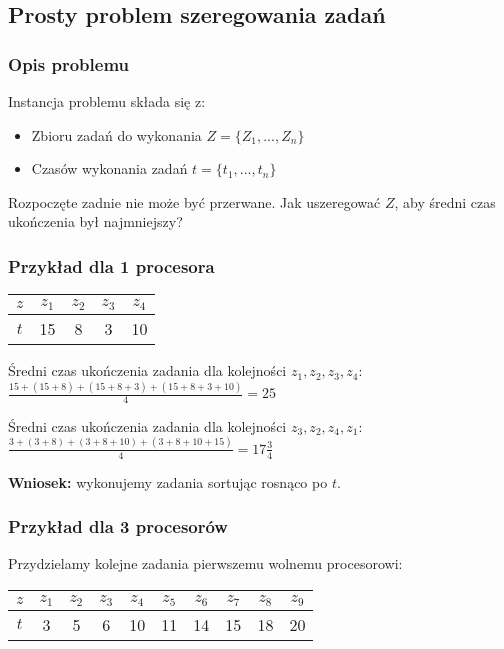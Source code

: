\subsection{Prosty problem szeregowania zadań}
\subsubsection{Opis problemu}
Instancja problemu składa się z:
\begin{itemize}
	\item Zbioru zadań do wykonania $Z= \{ Z_1,...,Z_n \}$
    \item Czasów wykonania zadań $t = \{ t_1,...,t_n\}$
\end{itemize}
Rozpoczęte zadnie nie może być przerwane.
Jak uszeregować $Z$, aby średni czas ukończenia był najmniejszy?

\subsubsection{Przykład dla 1 procesora}
\begin{center}
\begin{tabular}{ c | c | c | c | c }
  $z$ & $z_1$	& $z_2$ & $z_3$ & $z_4$ \\ \hline
  $t$ & 15 		&  8 	& 3 	& 10 \\ 
\end{tabular}
\end{center}
Średni czas ukończenia zadania dla kolejności $z_1, z_2, z_3, z_4$:
$\frac{15+(15+8)+(15+8+3)+(15+8+3+10)}{4}= 25$ 


Średni czas ukończenia zadania dla kolejności $z_3, z_2, z_4, z_1$:
$\frac{3+(3+8)+(3+8+10)+(3+8+10+15)}{4} = 17\frac{3}{4}$ 


\textbf{Wniosek:} wykonujemy zadania sortując rosnąco po $t$.

\subsubsection{Przykład dla 3 procesorów}
Przydzielamy kolejne zadania pierwszemu wolnemu procesorowi:
\begin{center}
\begin{tabular}{ c | c | c | c | c | c | c | c | c | c } 
  $z$ 	& $z_1$	& $z_2$ & $z_3$ & $z_4$	& $z_5$	& $z_6$ & $z_7$ & $z_8$	& $z_9$ \\ \hline
  $t$ 	& 3		& 5		& 6		& 10	& 11	& 14	& 15	& 18	& 20 \\ 
\end{tabular}
\end{center}


